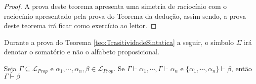 \begin{proof}
  A prova deste teorema apresenta uma simetria de raciocínio com o raciocínio apresentado pela prova do Teorema da dedução, assim sendo, a prova deste teorema irá ficar como exercício ao leitor.
\end{proof}

\begin{rema}
    Durante a prova do Teorema \ref{teo:TrasitividadeSintatica} a seguir, o símbolo $\Sigma$ irá denotar o somatório e não o alfabeto proposicional. 
\end{rema}

\begin{theorem}\label{teo:TrasitividadeSintatica}
    Seja $\Gamma \subseteq \mathcal{L}_{Prop}$ e $\alpha_1,\cdots,\alpha_n, \beta \in \mathcal{L}_{Prop}$. Se $\Gamma \vdash \alpha_1, \cdots, \Gamma \vdash \alpha_n$ e $\{\alpha_1, \cdots, \alpha_n\} \vdash \beta$, então $\Gamma \vdash \beta$
\end{theorem}

